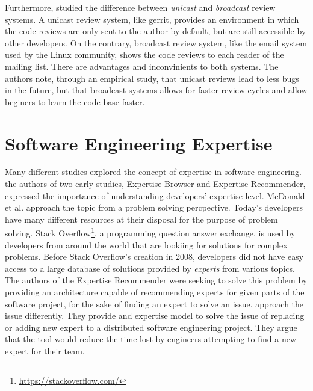 Furthermore, \citep{armstrong} studied the difference between \textit{unicast} and \textit{broadcast} review systems. A unicast review system, like gerrit, provides an environment in which the code reviews are only sent to the author by default, but are still accessible by other developers. On the contrary, broadcast review system, like the email system used by the Linux community, shows the code reviews to each reader of the mailing list. There are advantages and inconvinients to both systems. The authors note, through an empirical study, that unicast reviews lead to less bugs in the future, but that broadcast systems allows for faster review cycles and allow beginers to learn the code base faster. 



\section{Software Engineering Expertise}
\label{sec:expertise_models}

Many different studies explored the concept of expertise in software engineering. the authors of two early studies, Expertise Browser \citep{mockus02} and Expertise Recommender\citep{McDonald}, expressed the importance of understanding developers' expertise level. McDonald et al. approach the topic from a problem solving percpective. Today's developers have many different resources at their disposal for the purpose of problem solving. Stack Overflow\footnote{\url{https://stackoverflow.com/}}, a programming question answer exchange, is used by developers from around the world that are lookiing for solutions for complex problems. Before Stack Overflow's creation in 2008, developers did not have easy access to a large database of solutions provided by \textit{experts} from various topics. The authors of the Expertise Recommender were seeking to solve this problem by providing an architecture capable of recommending experts for given parts of the software project, for the sake of finding an expert to solve an issue. \citep{mockus02} approach the issue differently. They provide and expertise model to solve the issue of replacing or adding new expert to a distributed software engineering project. They argue that the tool would reduce the time lost by engineers attempting to find a new expert for their team. 


